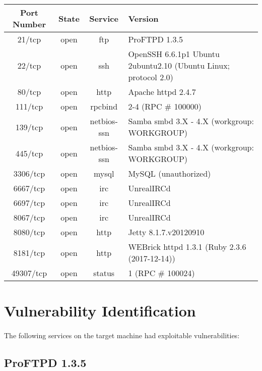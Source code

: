 \documentclass{article}
\begin{document}
\begin{adjustwidth}{-2cm}{}
\begin{tabular}{ |c|c|c|l| }
\hline
Port Number & State & Service & Version \\
\hline
21/tcp & open & ftp & ProFTPD 1.3.5 \\
\hline
22/tcp & open & ssh & OpenSSH 6.6.1p1 Ubuntu 2ubuntu2.10 (Ubuntu Linux; protocol 2.0) \\
\hline
80/tcp & open & http & Apache httpd 2.4.7 \\
\hline
111/tcp & open & rpcbind & 2-4 (RPC \# 100000) \\
\hline
139/tcp & open & netbios-ssn & Samba smbd 3.X - 4.X (workgroup: WORKGROUP) \\
\hline
445/tcp & open & netbios-ssn & Samba smbd 3.X - 4.X (workgroup: WORKGROUP) \\
\hline
3306/tcp & open & mysql & MySQL (unauthorized) \\
\hline
6667/tcp & open & irc & UnrealIRCd \\
\hline
6697/tcp & open & irc & UnrealIRCd \\
\hline
8067/tcp & open & irc & UnrealIRCd \\
\hline
8080/tcp & open & http & Jetty 8.1.7.v20120910 \\
\hline
8181/tcp & open & http & WEBrick httpd 1.3.1 (Ruby 2.3.6 (2017-12-14)) \\
\hline
49307/tcp & open & status & 1 (RPC \# 100024) \\
\hline
\end{tabular}
\end{adjustwidth}

\newpage

\section{Vulnerability Identification}
\paragraph{}
The following services on the target machine had exploitable vulnerabilities:

\subsection{ProFTPD 1.3.5}
\end{document}
